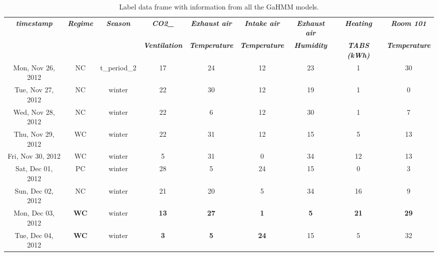 \begin{table}[htbp]
  \centering
  \tiny
  \caption{Label data frame with information from all the GaHMM models.}
    \begin{tabular}{|c|c|c|c|c|c|c|c|c|}
    \hline
    \textit{\textbf{timestamp}} & \textit{\textbf{Regime}} & \textit{\textbf{Season}} & \textit{\textbf{CO2\_}} & \textit{\textbf{Exhaust air}} & \textit{\textbf{Intake air}} & \textit{\textbf{Exhaust air}} & \textit{\textbf{Heating}} & \textit{\textbf{Room 101}} \bigstrut[t]\\
         &      &      & \textit{\textbf{Ventilation}} & \textit{\textbf{Temperature}} & \textit{\textbf{Temperature}} & \textit{\textbf{Humidity}} & \textit{\textbf{TABS (kWh)}} & \textit{\textbf{Temperature}} \bigstrut[b]\\
    \hline
    Mon, Nov 26, 2012 & NC   & t\_period\_2 & 17   & 24   & 12   & 23   & 1    & 30 \bigstrut\\
    \hline
    Tue, Nov 27, 2012 & NC   & winter & 22   & 30   & 12   & 19   & 1    & 0 \bigstrut\\
    \hline
    Wed, Nov 28, 2012 & NC   & winter & 22   & 6    & 12   & 30   & 1    & 7 \bigstrut\\
    \hline
    Thu, Nov 29, 2012 & WC   & winter & 22   & 31   & 12   & 15   & 5    & 13 \bigstrut\\
    \hline
    Fri, Nov 30, 2012 & WC   & winter & 5    & 31   & 0    & 34   & 12   & 13 \bigstrut\\
    \hline
    Sat, Dec 01, 2012 & PC   & winter & 28   & 5    & 24   & 15   & 0    & 3 \bigstrut\\
    \hline
    Sun, Dec 02, 2012 & NC   & winter & 21   & 20   & 5    & 34   & 16   & 9 \bigstrut\\
    \hline
    \rowcolor[rgb]{ .988,  .835,  .706} Mon, Dec 03, 2012 & \textbf{WC} & winter & \textcolor[rgb]{ 1,  0,  0}{\textbf{13}} & \textcolor[rgb]{ 1,  0,  0}{\textbf{27}} & \textcolor[rgb]{ 1,  0,  0}{\textbf{1}} & \textcolor[rgb]{ 1,  0,  0}{\textbf{5}} & \textcolor[rgb]{ 1,  0,  0}{\textbf{21}} & \textcolor[rgb]{ 1,  0,  0}{\textbf{29}} \bigstrut\\
    \hline
    \rowcolor[rgb]{ .988,  .835,  .706} Tue, Dec 04, 2012 & \textbf{WC} & winter & \textcolor[rgb]{ 1,  0,  0}{\textbf{3}} & \textcolor[rgb]{ 1,  0,  0}{\textbf{5}} & \textcolor[rgb]{ 1,  0,  0}{\textbf{24}} & \cellcolor[rgb]{ 1,  1,  1} 15 & \cellcolor[rgb]{ 1,  1,  1} 5 & \cellcolor[rgb]{ 1,  1,  1} 32 \bigstrut\\

\end{tabular}
\end{table}
